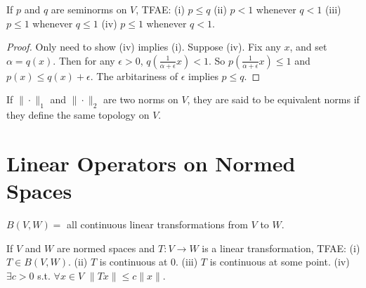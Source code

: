 \begin{lemma}
    If $p$ and $q$ are seminorms on $V$, TFAE: \newline
    (i) $p\le q$ \newline 
    (ii) $p<1$ whenever $q<1$\newline 
    (iii) $p\le 1$ whenever $q\le 1$ \newline 
    (iv) $p\le 1$ whenever $q<1$.
\end{lemma}
\begin{proof}
    Only need to show (iv) implies (i). \newline 
    Suppose (iv). Fix any $x$, and set $\alpha=q(x)$. Then for any $\epsilon>0$, $q(\frac{1}{\alpha+\epsilon}x)<1$.
    So $p(\frac{1}{\alpha+\epsilon}x)\le 1$ and $p(x)\le q(x)+\epsilon$. The arbitariness of $\epsilon$ implies $p\le q$.
\end{proof}

\begin{definition}
    If $\|\cdot\|_1$ and $\|\cdot\|_2$ are two norms on $V$, they are said to be equivalent norms if they define
    the same topology on $V$.
\end{definition}

\begin{lemma}
    
\end{lemma}

\section{Linear Operators on Normed Spaces}
$B(V,W)=$ all continuous linear transformations from $V$ to $W$.


\begin{lemma}
    If $V$ and $W$ are normed spaces and $T:V\to W$ is a linear transformation, TFAE:\newline 
    (i) $T\in B(V,W)$. \newline 
    (ii) $T$ is continuous at $0$. \newline 
    (iii) $T$ is continuous at some point.\newline 
    (iv) $\exists c>0$ s.t. $\forall x\in V$ $\|Tx\|\le c\|x\|$.
\end{lemma}


